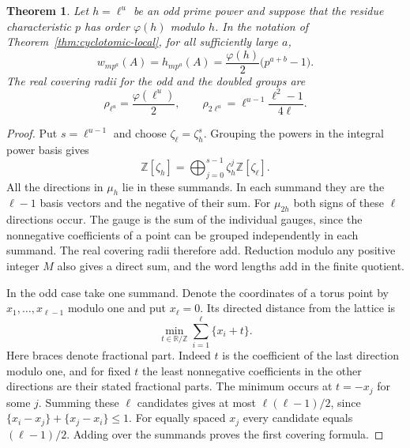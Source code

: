 \documentclass[11pt,letterpaper]{article}
\newtheorem{theorem}{Theorem}[section]
\theoremstyle{definition}
\numberwithin{equation}{section}
\begin{document}
\begin{theorem}\label{thm:local-inert-simplex}
Let $h=\ell^u$ be an odd prime power and suppose that the residue
characteristic $p$ has order $\varphi(h)$ modulo $h$. In the notation
of Theorem~\ref{thm:cyclotomic-local}, for all sufficiently large $a$,
\[
       w_{mp^a}(A)=h_{mp^a}(A)
               =\frac{\varphi(h)}2\bigl(p^{a+b}-1\bigr).
\]
The real covering radii for the odd and the doubled groups are
\begin{equation}\label{eq:local-prime-power-radius}
       \rho_{\ell^u}=\frac{\varphi(\ell^u)}2,\qquad
       \rho_{2\ell^u}=\ell^{u-1}\frac{\ell^2-1}{4\ell}.
\end{equation}
\end{theorem}

\begin{proof}
Put $s=\ell^{u-1}$ and choose $\zeta_{\ell}=\zeta_h^s$. Grouping
the powers in the integral power basis gives
\[
       \mathbb Z[\zeta_h]=
       \bigoplus_{j=0}^{s-1}\zeta_h^j\mathbb Z[\zeta_\ell].
\]
All the directions in $\mu_h$ lie in these summands. In each summand
they are the $\ell-1$ basis vectors and the negative of their sum.
For $\mu_{2h}$ both signs of these $\ell$ directions occur. The gauge
is the sum of the individual gauges, since the nonnegative
coefficients of a point can be grouped independently in each summand.
The real covering radii therefore add. Reduction modulo any positive
integer $M$ also gives a direct sum, and the word lengths add in the
finite quotient.

In the odd case take one summand. Denote the coordinates of a torus
point by $x_1,\ldots,x_{\ell-1}$ modulo one and put $x_\ell=0$.
Its directed distance from the lattice is
\[
                    \min_{t\in\mathbb R/\mathbb Z}
                                \sum_{i=1}^{\ell}\{x_i+t\} .
\]
Here braces denote fractional part. Indeed $t$ is the coefficient
of the last direction modulo one, and for fixed $t$ the least
nonnegative coefficients in the other directions are their stated
fractional parts. The minimum occurs at $t=-x_j$ for some $j$.
Summing these $\ell$ candidates gives at most $\ell(\ell-1)/2$,
since $\{x_i-x_j\}+\{x_j-x_i\}\le1$. For equally spaced $x_j$
every candidate equals $(\ell-1)/2$. Adding over the summands
proves the first covering formula.


\end{proof}
\end{document}
